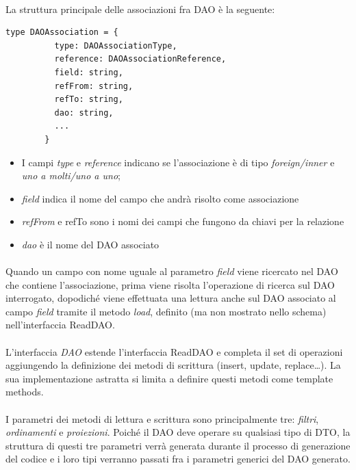 \documentclass[a4paper, 12pt]{report}
\begin{document}
      \paragraph*{}
      La struttura principale delle associazioni fra DAO è la seguente:
      \begin{Verbatim}[samepage=true]
        type DAOAssociation = {
          type: DAOAssociationType,
          reference: DAOAssociationReference,
          field: string,
          refFrom: string,
          refTo: string,
          dao: string,
          ...
        }
      \end{Verbatim}
      \begin{itemize}
        \item I campi \emph{type} e \emph{reference} indicano se l'associazione è di tipo \emph{foreign/inner} e \emph{uno a molti/uno a uno};
        \item \emph{field} indica il nome del campo che andrà risolto come associazione
        \item \emph{refFrom} e refTo sono i nomi dei campi che fungono da chiavi per la relazione
        \item \emph{dao} è il nome del DAO associato
      \end{itemize}
      \paragraph*{}
      Quando un campo con nome uguale al parametro \emph{field} viene ricercato nel DAO che contiene l'associazione, prima viene risolta l'operazione di ricerca sul DAO interrogato, dopodiché
      viene effettuata una lettura anche sul DAO associato al campo \emph{field} tramite il metodo \emph{load}, definito (ma non mostrato nello schema) nell'interfaccia ReadDAO.
      \paragraph*{}
      L'interfaccia \emph{DAO} estende l'interfaccia ReadDAO e completa il set di operazioni aggiungendo la definizione dei metodi di scrittura (insert, update, replace\dots).
      La sua implementazione astratta si limita a definire questi metodi come template methods.
      \paragraph*{}
      I parametri dei metodi di lettura e scrittura sono principalmente tre: \emph{filtri}, \emph{ordinamenti} e \emph{proiezioni}.
      Poiché il DAO deve operare su qualsiasi tipo di DTO, la struttura di questi tre parametri verrà generata durante il processo di generazione del codice e i loro tipi
      verranno passati fra i parametri generici del DAO generato.
\end{document}

